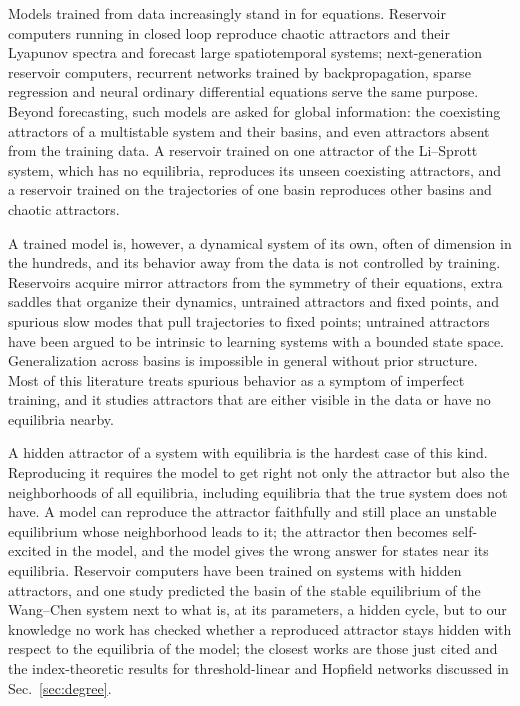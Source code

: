 \documentclass[aip,cha,reprint,amsmath,amssymb,longbibliography]{revtex4-2}
\theoremstyle{definition}
\begin{document}
Models trained from data increasingly stand in for equations. Reservoir computers running in closed loop reproduce chaotic
attractors and their Lyapunov spectra\cite{JaegerHaas2004,Pathak2017Chaos,LuHuntOtt2018} and forecast large spatiotemporal
systems;\cite{Pathak2018PRL} next-generation reservoir computers,\cite{Gauthier2021NGRC} recurrent networks trained by
backpropagation,\cite{Vlachas2020Backprop} sparse regression\cite{Brunton2016SINDy} and neural ordinary differential
equations\cite{Chen2018NeuralODE} serve the same purpose. Beyond forecasting, such models are asked for global information:
the coexisting attractors of a multistable system and their basins,\cite{Roy2022Multistability,Liu2025HiddenDynamics} and
even attractors absent from the training data. A reservoir trained on one attractor of the Li--Sprott system, which has no
equilibria, reproduces its unseen coexisting attractors,\cite{Rohm2021,Rohm2022Unseen} and a reservoir trained on the
trajectories of one basin reproduces other basins and chaotic attractors.\cite{Norton2025Unseen}

A trained model is, however, a dynamical system of its own, often of dimension in the hundreds, and its behavior away from
the data is not controlled by training. Reservoirs acquire mirror attractors from the symmetry of their
equations,\cite{HerteuxRath2020} extra saddles that organize their dynamics,\cite{Kabayama2025PseudoLorenz} untrained
attractors and fixed points,\cite{Flynn2021,Hart2024CLE,Norton2025Unseen} and spurious slow modes that pull trajectories to
fixed points;\cite{Oishi2026FastSlow} untrained attractors have been argued to be intrinsic to learning systems with a
bounded state space.\cite{OHagan2025Confabulation} Generalization across basins is impossible in general without prior
structure.\cite{Goring2024OOD} Most of this literature treats spurious behavior as a symptom of imperfect training, and it
studies attractors that are either visible in the data or have no equilibria nearby.

A hidden attractor of a system with equilibria is the hardest case of this kind. Reproducing it requires the model to get
right not only the attractor but also the neighborhoods of all equilibria, including equilibria that the true system does
not have. A model can reproduce the attractor faithfully and still place an unstable equilibrium whose neighborhood leads to
it; the attractor then becomes self-excited in the model, and the model gives the wrong answer for states near its
equilibria. Reservoir computers have been trained on systems with hidden attractors,\cite{Xu2024SelfESN,Mahata2025Extreme}
and one study predicted the basin of the stable equilibrium of the Wang--Chen system next to what is, at its parameters, a
hidden cycle,\cite{Liu2025HiddenDynamics} but to our knowledge no work has checked whether a reproduced attractor stays
hidden with respect to the equilibria of the model; the closest works are those just cited and the index-theoretic
results for threshold-linear and Hopfield networks discussed in Sec.~\ref{sec:degree}.
\end{document}
